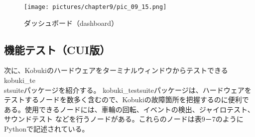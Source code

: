\begin{figure}[htp]
  \centering
  \texttt{[image: pictures/chapter9/pic\_09\_15.png]}
  \caption{ダッシュボード（dashboard）}
\end{figure}

\subsection{機能テスト（CUI版）}

次に、Kobukiのハードウェアをターミナルウィンドウからテストできるkobuki\_te\\stsuiteパッケージを紹介する。
kobuki\_testsuiteパッケージは、ハードウェアをテストするノードを数多く含むので、Kobukiの故障箇所を把握するのに便利である。使用できるノードには、車輪の回転、イベントの検出、ジャイロテスト、サウンドテスト  などを行うノードがある。これらのノードは表9－7のようにPythonで記述されている。


